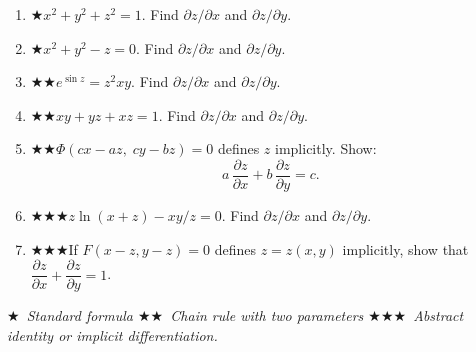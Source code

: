 \documentclass[12pt,a4paper]{article}
\newcommand{\easy}{{\color{green!60!black}$\bigstar$}}
\newcommand{\medium}{{\color{orange}$\bigstar\bigstar$}}
\newcommand{\hard}{{\color{red}$\bigstar\bigstar\bigstar$}}
\begin{document}
\begin{enumerate}[leftmargin=*, label=(\alph*)]
\item \easy\quad $x^2+y^2+z^2=1$. Find $\partial z/\partial x$ and $\partial z/\partial y$.
\item \easy\quad $x^2+y^2-z = 0$. Find $\partial z/\partial x$ and $\partial z/\partial y$.
\item \medium\quad $e^{\sin z}=z^2 xy$. Find $\partial z/\partial x$ and $\partial z/\partial y$.
\item \medium\quad $xy + yz + xz = 1$. Find $\partial z/\partial x$ and $\partial z/\partial y$.
\item \medium\quad $\Phi(cx - az,\; cy - bz)=0$ defines $z$ implicitly. Show:
\[a\,\frac{\partial z}{\partial x}+b\,\frac{\partial z}{\partial y}=c.\]
\item \hard\quad $z\ln(x+z)-xy/z=0$. Find $\partial z/\partial x$ and $\partial z/\partial y$.
\item \hard\quad If $F(x-z, y-z) = 0$ defines $z = z(x,y)$ implicitly, show that
$\dfrac{\partial z}{\partial x}+\dfrac{\partial z}{\partial y}=1$.
\end{enumerate}

\bigskip
\begin{center}
\small\itshape
\easy\ Standard formula\quad
\medium\ Chain rule with two parameters\quad
\hard\ Abstract identity or implicit differentiation.
\end{center}
\end{document}
